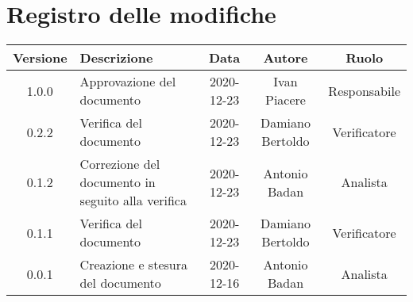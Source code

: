 \section*{Registro delle modifiche}

\begin{center}
	\begin{longtable}{|c|p{5cm}|c|c|c|}
	\hline
	\rowcolor{lighter-grayer}
	\textbf{Versione} & \textbf{Descrizione} & \textbf{Data} & \textbf{Autore} & \textbf{Ruolo} \\
	\hline
	\endfirsthead

	
	\hline
	1.0.0 & Approvazione del documento & 2020-12-23 & Ivan Piacere & Responsabile \\
	\hline
	0.2.2 & Verifica del documento & 2020-12-23 & Damiano Bertoldo & Verificatore \\
	\hline
	0.1.2 & Correzione del documento in seguito alla verifica & 2020-12-23 & Antonio Badan & Analista \\
	\hline
	0.1.1 & Verifica del documento & 2020-12-23 & Damiano Bertoldo & Verificatore \\
	\hline
	0.0.1 & Creazione e stesura del documento & 2020-12-16 & Antonio Badan & Analista \\
	\hline
	
	
	
	

	\end{longtable}
\end{center}